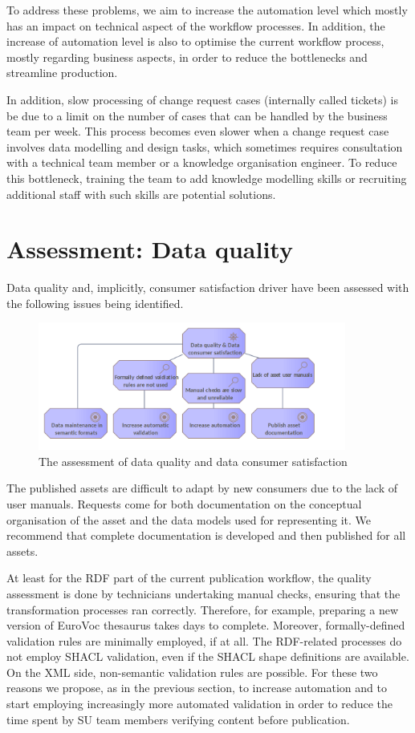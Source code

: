 	To address these problems, we aim to increase the automation level which mostly has an impact on technical aspect of the workflow processes. In addition, the increase of automation level is also to optimise the current workflow process, mostly regarding business aspects, in order to reduce the bottlenecks and streamline production.  
	
	In addition, slow processing of change request cases (internally called tickets) is be due to a limit on the number of cases that can be handled by the business team per week. This process becomes even slower when a change request case involves data modelling and design tasks, which sometimes requires consultation with a technical team member or a knowledge organisation engineer. To reduce this bottleneck, training the team to add knowledge modelling skills or recruiting additional staff with such skills are potential solutions.

	\section{Assessment: Data quality}

    Data quality and, implicitly, consumer satisfaction driver have been assessed with the following issues being identified.
    
	\begin{figure}[!h]
		\centering
		\includegraphics[width=0.9\textwidth]{images/motivation/Data quality.png}
		\caption{The assessment of data quality and data consumer satisfaction}
		\label{fig:data-quality}
	\end{figure}

    The published assets are difficult to adapt by new consumers due to the lack of user manuals. Requests come for both documentation on the conceptual organisation of the asset and the data models used for representing it. We recommend that complete documentation is developed and then published for all assets.
    
    At least for the RDF part of the current publication workflow, the quality assessment is done by technicians undertaking manual checks, ensuring that the transformation processes ran correctly. Therefore, for example, preparing a new version of EuroVoc thesaurus takes days to complete. Moreover, formally-defined validation rules are minimally employed, if at all. The RDF-related processes do not employ SHACL validation, even if the SHACL shape definitions are available. On the XML side, non-semantic validation rules are possible. For these two reasons we propose, as in the previous section, to increase automation and to start employing increasingly more automated validation in order to reduce the time spent by SU team members verifying content before publication. 
    
